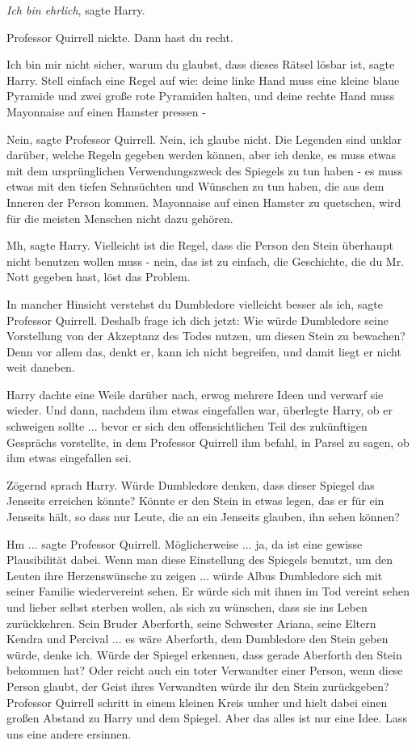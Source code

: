 \glqq{}\emph{Ich bin ehrlich}\grqq{}, sagte Harry.

Professor Quirrell nickte. \glqq{}Dann hast du recht.\grqq{}

\glqq{}Ich bin mir nicht sicher, warum du glaubst, dass dieses Rätsel lösbar
ist\grqq{}, sagte Harry. \glqq{}Stell einfach eine Regel auf wie: deine linke
Hand muss eine kleine blaue Pyramide und zwei große rote Pyramiden halten, und
deine rechte Hand muss Mayonnaise auf einen Hamster pressen -\grqq{}

\glqq{}Nein\grqq{}, sagte Professor Quirrell. \glqq{}Nein, ich glaube nicht. Die
Legenden sind unklar darüber, welche Regeln gegeben werden können, aber ich
denke, es muss etwas mit dem ursprünglichen Verwendungszweck des Spiegels zu tun
haben - es muss etwas mit den tiefen Sehnsüchten und Wünschen zu tun haben, die
aus dem Inneren der Person kommen. Mayonnaise auf einen Hamster zu quetschen,
wird für die meisten Menschen nicht dazu gehören.\grqq{}

\glqq{}Mh\grqq{}, sagte Harry. \glqq{}Vielleicht ist die Regel, dass die Person
den Stein überhaupt nicht benutzen wollen muss - nein, das ist zu einfach, die
Geschichte, die du Mr. Nott gegeben hast, löst das Problem.\grqq{}

\glqq{}In mancher Hinsicht verstehst du Dumbledore vielleicht besser als
ich\grqq{}, sagte Professor Quirrell. \glqq{}Deshalb frage ich dich jetzt: Wie
würde Dumbledore seine Vorstellung von der Akzeptanz des Todes nutzen, um diesen
Stein zu bewachen? Denn vor allem das, denkt er, kann ich nicht begreifen, und
damit liegt er nicht weit daneben.\grqq{}

Harry dachte eine Weile darüber nach, erwog mehrere Ideen und verwarf sie
wieder. Und dann, nachdem ihm etwas eingefallen war, überlegte Harry, ob er
schweigen sollte ... bevor er sich den offensichtlichen Teil des zukünftigen
Gesprächs vorstellte, in dem Professor Quirrell ihm befahl, in Parsel zu sagen,
ob ihm etwas eingefallen sei.

Zögernd sprach Harry. \glqq{}Würde Dumbledore denken, dass dieser Spiegel das
Jenseits erreichen könnte? Könnte er den Stein in etwas legen, das er für ein
Jenseits hält, so dass nur Leute, die an ein Jenseits glauben, ihn sehen
können?\grqq{}

\glqq{}Hm ...\grqq{} sagte Professor Quirrell. \glqq{}Möglicherweise ... ja, da ist
eine gewisse Plausibilität dabei. Wenn man diese Einstellung des Spiegels
benutzt, um den Leuten ihre Herzenswünsche zu zeigen ... würde Albus Dumbledore
sich mit seiner Familie wiedervereint sehen. Er würde sich mit ihnen im Tod
vereint sehen und lieber selbst sterben wollen, als sich zu wünschen, dass sie
ins Leben zurückkehren. Sein Bruder Aberforth, seine Schwester Ariana, seine
Eltern Kendra und Percival ... es wäre Aberforth, dem Dumbledore den Stein geben
würde, denke ich. Würde der Spiegel erkennen, dass gerade Aberforth den Stein
bekommen hat? Oder reicht auch ein toter Verwandter einer Person, wenn diese
Person glaubt, der Geist ihres Verwandten würde ihr den Stein
zurückgeben?\grqq{} Professor Quirrell schritt in einem kleinen Kreis umher und
hielt dabei einen großen Abstand zu Harry und dem Spiegel. \glqq{}Aber das alles
ist nur eine Idee. Lass uns eine andere ersinnen.\grqq{}

